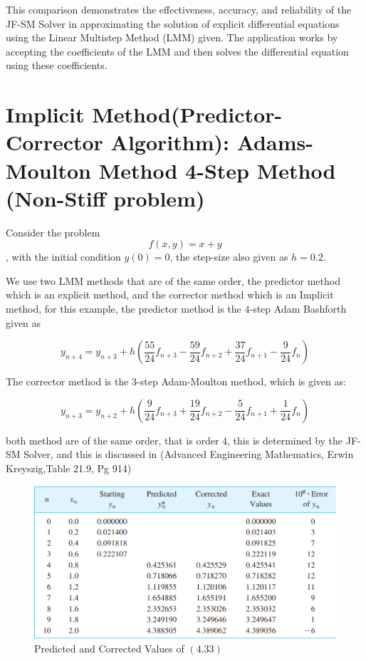 \documentclass[a4paper, twoside]{report} %
\begin{document}
	This comparison demonstrates the effectiveness, accuracy, and reliability of the JF-SM Solver in approximating the solution of explicit differential equations using the Linear Multistep Method (LMM) given. The application works by accepting the coefficients of the LMM and then solves the differential equation using these coefficients.

	\section{Implicit Method(Predictor-Corrector Algorithm): Adams-Moulton Method 4-Step Method (Non-Stiff problem)}

	Consider the problem \begin{equation}
		f(x,y) = x + y
	\end{equation}, with the initial condition $y(0) = 0$, the step-size also given as $h = 0.2$.

	We use two LMM methods that are of the same order, the predictor method which is an explicit method, and the corrector method which is an Implicit method, for this example, the predictor method is the 4-step Adam Bashforth given as

	\begin{equation}
		y_{n+4}  = y_{n+3} + h \left(\frac{55}{24}f_{n+3} - \frac{59}{24}f_{n+2} + \frac{37}{24}f_{n+1} - \frac{9}{24}f_{n}\right)
	\end{equation}

	The corrector method is the 3-step Adam-Moulton method, which is given as:

	\begin{equation}
		y_{n+3}  = y_{n+2} + h \left(\frac{9}{24}f_{n+3} + \frac{19}{24}f_{n+2} - \frac{5}{24}f_{n+1} + \frac{1}{24}f_{n}\right)
	\end{equation}

	both method are of the same order, that is order 4, this is determined by the JF-SM Solver, and this is discussed in  (Advanced Engineering Mathematics, Erwin Kreyszig,Table 21.9, Pg 914)

	\begin{figure}[htbp]
		\centering
		\includegraphics[width=1\textwidth]{chapters/4/image/solver_4.png}
		\caption{Predicted and Corrected Values of $(4.33)$ }
	\end{figure}
\end{document}
